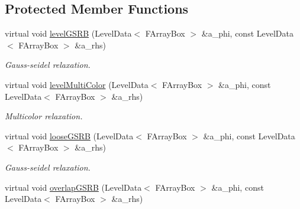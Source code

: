 \subsection*{Protected Member Functions}
\begin{DoxyCompactItemize}
\item 
\hypertarget{class_a_m_r_non_linear_v_c_op_aa9aa7b75934e71ec35cba40b27363eb0}{virtual void \hyperlink{class_a_m_r_non_linear_v_c_op_aa9aa7b75934e71ec35cba40b27363eb0}{level\-G\-S\-R\-B} (Level\-Data$<$ F\-Array\-Box $>$ \&a\-\_\-phi, const Level\-Data$<$ F\-Array\-Box $>$ \&a\-\_\-rhs)}\label{class_a_m_r_non_linear_v_c_op_aa9aa7b75934e71ec35cba40b27363eb0}

\begin{DoxyCompactList}\small\item\em Gauss-\/seidel relaxation. \end{DoxyCompactList}\item 
\hypertarget{class_a_m_r_non_linear_v_c_op_a464b0395451b59ecb0a7a776c3543047}{virtual void \hyperlink{class_a_m_r_non_linear_v_c_op_a464b0395451b59ecb0a7a776c3543047}{level\-Multi\-Color} (Level\-Data$<$ F\-Array\-Box $>$ \&a\-\_\-phi, const Level\-Data$<$ F\-Array\-Box $>$ \&a\-\_\-rhs)}\label{class_a_m_r_non_linear_v_c_op_a464b0395451b59ecb0a7a776c3543047}

\begin{DoxyCompactList}\small\item\em Multicolor relaxation. \end{DoxyCompactList}\item 
\hypertarget{class_a_m_r_non_linear_v_c_op_a81eecf4b5e7ac459e6e2f7679010fb44}{virtual void \hyperlink{class_a_m_r_non_linear_v_c_op_a81eecf4b5e7ac459e6e2f7679010fb44}{loose\-G\-S\-R\-B} (Level\-Data$<$ F\-Array\-Box $>$ \&a\-\_\-phi, const Level\-Data$<$ F\-Array\-Box $>$ \&a\-\_\-rhs)}\label{class_a_m_r_non_linear_v_c_op_a81eecf4b5e7ac459e6e2f7679010fb44}

\begin{DoxyCompactList}\small\item\em Gauss-\/seidel relaxation. \end{DoxyCompactList}\item 
\hypertarget{class_a_m_r_non_linear_v_c_op_adaec2d3df86f1a67c76408c75c650157}{virtual void \hyperlink{class_a_m_r_non_linear_v_c_op_adaec2d3df86f1a67c76408c75c650157}{overlap\-G\-S\-R\-B} (Level\-Data$<$ F\-Array\-Box $>$ \&a\-\_\-phi, const Level\-Data$<$ F\-Array\-Box $>$ \&a\-\_\-rhs)}\label{class_a_m_r_non_linear_v_c_op_adaec2d3df86f1a67c76408c75c650157}


\end{DoxyCompactItemize}
